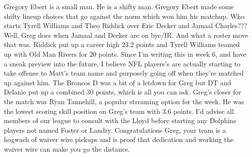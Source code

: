 \documentclass[11pt,letterpaper]{article}
\begin{document}
\par\noindent Gregory Ebert is a small man. He is a shifty man. Gregory Ebert made some shifty lineup choices that go against the norm which won him his matchup. Who starts Tyrell Williams and Theo Riddick over Eric Decker and Jamaal Charles??? Well, Greg does when Jamaal and Decker are on bye/IR. And what a roster move that was. Riddick put up a career high 23.2 points and Tyrell Williams teamed up with Old Man Rivers for 20 points. Since I'm writing this in week 6, and have a sneak preview into the future, I believe NFL players's are actually starting to take offense to Matt's team name and purposely going off when they're matched up against him. The Broncos D was a bit of a letdown for Greg but DT and Delanie put up a combined 30 points, which is all you can ask. Greg's closer for the match was Ryan Tannehill, a popular streaming option for the week. He was the lowest scoring skill position on Greg's team with 3.6 points. I'd advise all members of our league to consult with the Lloyd before starting any Dolphins players not named Foster or Landry. Congratulations Greg, your team is a hogwash of waiver wire pickups and is proof that dedication and working the waiver wire can make you go the distance.
\end{document}
